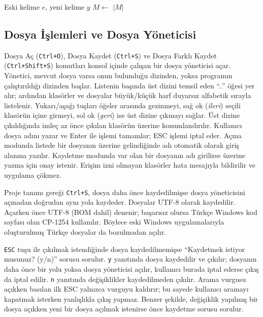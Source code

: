 \documentclass[conference,a4paper]{IEEEtran}
\newcommand{\kod}[1]{\texttt{#1}}
\begin{document}
\begin{algorithm}[t]
\caption{Tümünü Değiştir}
\label{alg:replace}
\begin{algorithmic}[1]
\Require Eski kelime $e$, yeni kelime $y$
\State $M \gets$  
\State {}
  \State {}
   \State {}
  \EndIf
\EndFor
\State {} 
\State \Return $|M|$
\end{algorithmic}
\end{algorithm}

\subsection{Dosya İşlemleri ve Dosya Yöneticisi}

Dosya Aç (\kod{Ctrl+O}), Dosya Kaydet (\kod{Ctrl+S}) ve Dosya Farklı Kaydet (\kod{Ctrl+Shift+S}) komutları konsol içinde çalışan bir dosya yöneticisi açar. Yönetici, mevcut dosya varsa onun bulunduğu dizinden, yoksa programın çalıştırıldığı dizinden başlar. Listenin başında üst dizini temsil eden ``..'' öğesi yer alır; ardından klasörler ve dosyalar büyük/küçük harf duyarsız alfabetik sırayla listelenir. Yukarı/aşağı tuşları öğeler arasında gezinmeyi, sağ ok (\textit{ileri}) seçili klasörün içine girmeyi, sol ok (\textit{geri}) ise üst dizine çıkmayı sağlar. Üst dizine çıkıldığında imleç az önce çıkılan klasörün üzerine konumlandırılır. Kullanıcı dosya adını yazar ve Enter ile işlemi tamamlar; ESC işlemi iptal eder. Açma modunda listede bir dosyanın üzerine gelindiğinde adı otomatik olarak giriş alanına yazılır. Kaydetme modunda var olan bir dosyanın adı girilirse üzerine yazma için onay istenir. Erişim izni olmayan klasörler hata mesajıyla bildirilir ve uygulama çökmez.

Proje tanımı gereği \kod{Ctrl+S}, dosya daha önce kaydedilmişse dosya yöneticisini açmadan doğrudan aynı yola kaydeder. Dosyalar UTF-8 olarak kaydedilir. Açarken önce UTF-8 (BOM dahil) denenir; başarısız olursa Türkçe Windows kod sayfası olan CP-1254 kullanılır. Böylece eski Windows uygulamalarıyla oluşturulmuş Türkçe dosyalar da bozulmadan açılır.

\kod{ESC} tuşu ile çıkılmak istendiğinde dosya kaydedilmemişse ``Kaydetmek istiyor musunuz? (y/n)'' sorusu sorulur. \kod{y} yanıtında dosya kaydedilir ve çıkılır; dosyanın daha önce bir yolu yoksa dosya yöneticisi açılır, kullanıcı burada iptal ederse çıkış da iptal edilir. \kod{n} yanıtında değişiklikler kaydedilmeden çıkılır. Arama vurgusu açıkken basılan ilk ESC yalnızca vurguyu kaldırır; bu sayede kullanıcı aramayı kapatmak isterken yanlışlıkla çıkış yapmaz. Benzer şekilde, değişiklik yapılmış bir dosya açıkken yeni bir dosya açılmak istenirse önce kaydetme sorusu sorulur.
\end{document}
